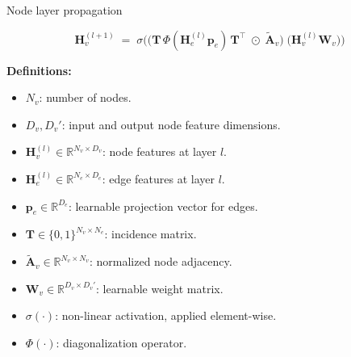 \documentclass[hyperref={colorlinks,citecolor=blue,linkcolor=blue,urlcolor=blue}]{beamer}
\begin{document}
\begin{frame}{Node layer propagation}
\footnotesize

\[
\mathbf{H}_v^{(l+1)} \;=\; \sigma\Big(
\big( \mathbf{T}\,\Phi(\mathbf{H}_e^{(l)}\mathbf{p}_e)\,\mathbf{T}^\top \;\odot\; \tilde{\mathbf{A}}_v \big)
\; \big(\mathbf{H}_v^{(l)} \mathbf{W}_v \big)
\Big)
\]

\vspace{0.5cm}

\textbf{Definitions:}
\begin{itemize}\footnotesize
    \item \(N_v\): number of nodes.
    \item \(D_v, D_v'\): input and output node feature dimensions.
    \item \(\mathbf{H}_v^{(l)} \in \mathbb{R}^{N_v \times D_v}\): node features at layer \(l\).
    \item \(\mathbf{H}_e^{(l)} \in \mathbb{R}^{N_e \times D_e}\): edge features at layer \(l\).
    \item \(\mathbf{p}_e \in \mathbb{R}^{D_e}\): learnable projection vector for edges.
    \item \(\mathbf{T} \in \{0,1\}^{N_v \times N_e}\): incidence matrix.
    \item \(\tilde{\mathbf{A}}_v \in \mathbb{R}^{N_v \times N_v}\): normalized node adjacency.
    \item \(\mathbf{W}_v \in \mathbb{R}^{D_v \times D_v'}\): learnable weight matrix.
    \item \(\sigma(\cdot)\): non-linear activation, applied element-wise.
    \item \(\Phi(\cdot)\): diagonalization operator.
\end{itemize}
\end{frame}
\end{document}
